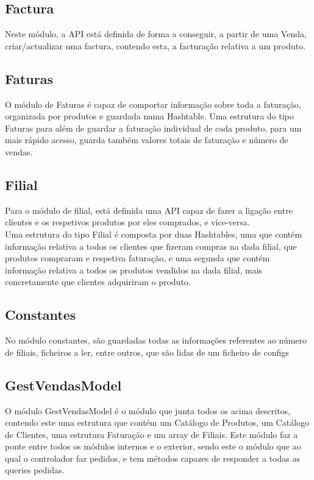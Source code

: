 \documentclass[a4paper]{report}
\begin{document}
\subsection{Factura}

Neste módulo, a API está definida de forma a conseguir, a partir de uma Venda,
criar/actualizar uma factura, contendo esta, a facturação relativa a um produto.

\subsection{Faturas}

O módulo de Faturas é capaz de comportar informação sobre toda a faturação,
organizada por produtos e guardada numa Hashtable. Uma estrutura do tipo Faturas
para além de guardar a faturação individual de cada produto, para um mais rápido 
acesso, guarda também valores totais de faturação e número de vendas.

\subsection{Filial}

Para o módulo de filial, está definida uma API capaz de fazer a ligação entre 
clientes e os respetivos produtos por eles comprados, e vice-versa.\\
Uma estrutura do tipo Filial é composta por duas Hashtables, uma que contém
informação relativa a todos os clientes que fizeram compras na dada filial, 
que produtos compraram e respetiva faturação, e uma segunda que contém 
informação relativa a todos os produtos vendidos na dada filial, mais 
concretamente que clientes adquiriram o produto.

\subsection{Constantes}

No módulo constantes, são guardadas todas as informações referentes ao número de
filiais, ficheiros a ler, entre outros, que são lidas de um ficheiro de configs

\subsection{GestVendasModel}

O módulo GestVendasModel é o módulo que junta todos os acima descritos, 
contendo este uma estrutura
que contém um Catálogo de Produtos, um Catálogo de Clientes, uma estrutura Faturação e 
um array de Filiais. Este módulo faz a ponte entre todos os módulos internos e o 
exterior, sendo este o módulo que ao qual o controlador faz pedidos, e tem 
métodos capazes de responder a todas as queries pedidas.
\end{document}
